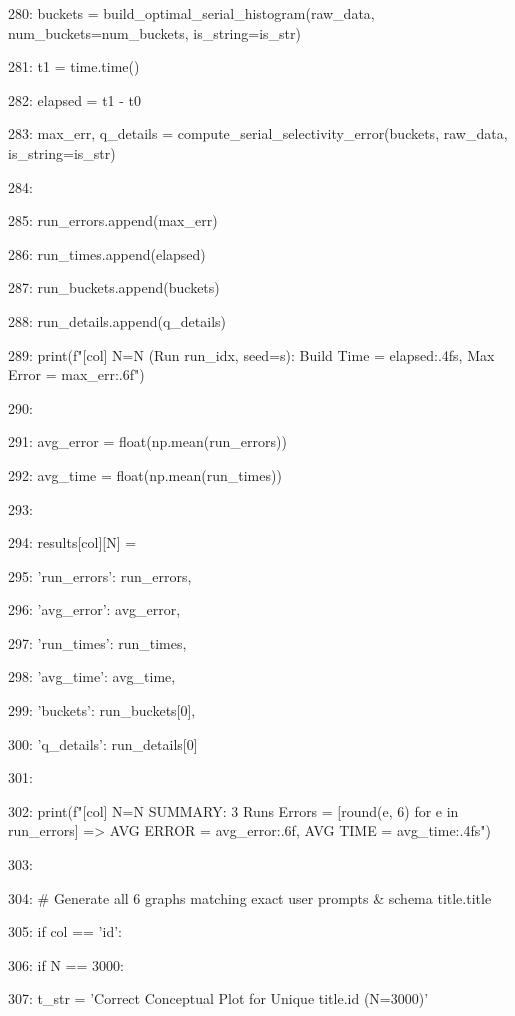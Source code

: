 \documentclass[11pt,a4paper]{article}
\begin{document}
280:                 buckets = build\_optimal\_serial\_histogram(raw\_data, num\_buckets=num\_buckets, is\_string=is\_str)

281:                 t1 = time.time()

282:                 elapsed = t1 - t0

283:                 max\_err, q\_details = compute\_serial\_selectivity\_error(buckets, raw\_data, is\_string=is\_str)

284:

285:                 run\_errors.append(max\_err)

286:                 run\_times.append(elapsed)

287:                 run\_buckets.append(buckets)

288:                 run\_details.append(q\_details)

289:                 print(f"[{col}] N={N} (Run {run\_idx}, seed={s}): Build Time = {elapsed:.4f}s, Max Error = {max\_err:.6f}")

290:

291:             avg\_error = float(np.mean(run\_errors))

292:             avg\_time = float(np.mean(run\_times))

293:

294:             results[col][N] = {

295:                 'run\_errors': run\_errors,

296:                 'avg\_error': avg\_error,

297:                 'run\_times': run\_times,

298:                 'avg\_time': avg\_time,

299:                 'buckets': run\_buckets[0],

300:                 'q\_details': run\_details[0]

301:             }

302:             print(f"[{col}] N={N} SUMMARY: 3 Runs Errors = {[round(e, 6) for e in run\_errors]} => AVG ERROR = {avg\_error:.6f}, AVG TIME = {avg\_time:.4f}s")

303:

304:             \# Generate all 6 graphs matching exact user prompts \& schema title.title

305:             if col == 'id':

306:                 if N == 3000:

307:                     t\_str = 'Correct Conceptual Plot for Unique title.id (N=3000)'
\end{document}

